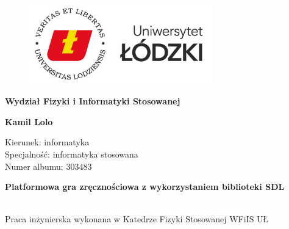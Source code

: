 \documentclass[12pt, a4paper, oneside]{Thesis} %
\begin{document}
\begin{titlepage}
\begin{center}

\begin{figure}
    \centering
    \includegraphics[width=300px]{./Pictures/logo.jpg}
\end{figure}

\begin{center}
{\Large \bfseries Wydział Fizyki i Informatyki Stosowanej }\\[0.4cm] 
\end{center}

\addvspace{40pt}

{\Large \bfseries Kamil Lolo }\\[0.4cm] %

\addvspace{40pt}
 
\begin{flushleft} 
Kierunek: informatyka\\
Specjalność:  informatyka stosowana \\
Numer albumu: 303483 \\
\end{flushleft}
 
\begin{center}
{\Large \bfseries Platformowa gra zręcznościowa z wykorzystaniem biblioteki SDL }\\[0.4cm] 
\end{center}

\begin{minipage}{0.4\textwidth}
\begin{flushleft} \large
\emph{ }
\end{flushleft}
\end{minipage}
\begin{minipage}{0.4\textwidth}
\begin{flushright} \large
\emph{ } \\
Praca inżynierska wykonana w Katedrze Fizyki Stosowanej WFiIS UŁ
\end{flushright}
\end{minipage}\\[3cm]


\end{center}
\end{titlepage}
\end{document}
